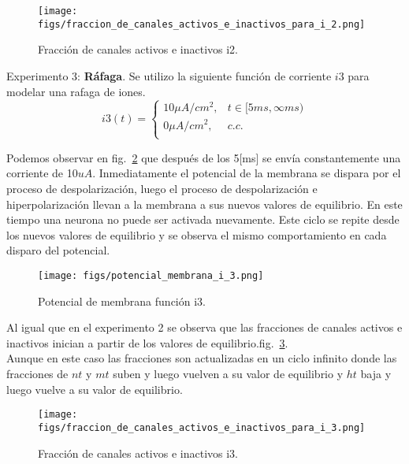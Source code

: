 \documentclass[aps,prl,twocolumn,groupedaddress]{revtex4-2}
\begin{document}
\begin{figure}[h!]
\centering
\texttt{[image: figs/fraccion\_de\_canales\_activos\_e\_inactivos\_para\_i\_2.png]}
\caption{Fracción de canales activos e inactivos i2. \label{fig4}}
\end{figure}

Experimento 3: \textbf{Ráfaga}. Se utilizo la siguiente función de corriente $i3$ para modelar una rafaga de iones.
$$
i3(t) = \left\{
\begin{array}{ll}
10 \mu A/cm^2, & t\in [5ms,\infty ms) \\
0 \mu A/cm^2, & c.c. \\
\end{array}
\right.
$$

Podemos observar en fig.~\ref{fig5} que después de los  5[ms] se envía constantemente una corriente de 10$uA$. Inmediatamente el potencial de la membrana se dispara por el proceso de despolarización, luego el proceso de despolarización e hiperpolarización llevan  a la membrana a sus nuevos valores de equilibrio. En este tiempo una neurona no puede ser activada nuevamente. Este ciclo se repite desde los nuevos valores de equilibrio y se observa el mismo comportamiento en cada disparo del potencial.\\


\begin{figure}[h!]
\centering
\texttt{[image: figs/potencial\_membrana\_i\_3.png]}
\caption{Potencial de membrana función i3. \label{fig5}}
\end{figure}


Al igual que en el experimento 2 se observa que las fracciones de canales activos e inactivos inician a partir de los valores de equilibrio.fig.~\ref{fig6}.\\
Aunque en este caso las fracciones son actualizadas en un ciclo infinito donde las fracciones de $nt$ y $mt$ suben y luego vuelven a su valor de equilibrio y $ht$ baja y luego vuelve a su valor de equilibrio. \\

\begin{figure}[h!]
\centering
\texttt{[image: figs/fraccion\_de\_canales\_activos\_e\_inactivos\_para\_i\_3.png]}
\caption{Fracción de canales activos e inactivos i3. \label{fig6}}
\end{figure}
\end{document}
